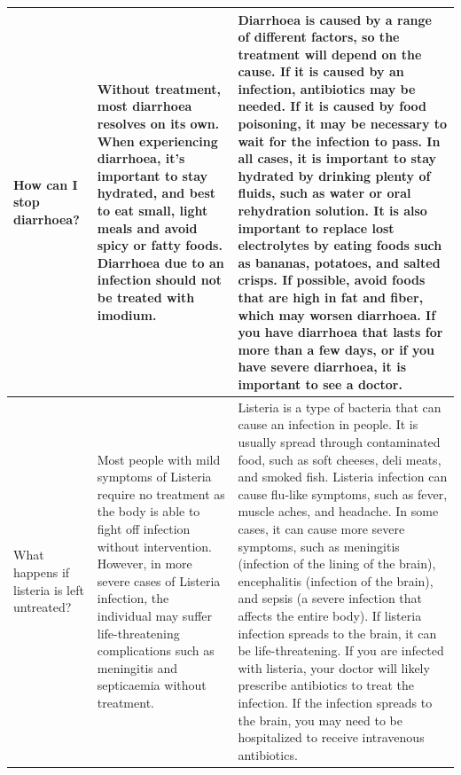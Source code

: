 \documentclass[10pt, letter, onecolumn]{arxiv}
\begin{document}
\begin{refsection}
\begin{table}[]
\begin{tabular}{p{}p{}p{}}
How can I stop diarrhoea? &
  Without treatment, most diarrhoea resolves on its own. When experiencing diarrhoea, it's important to stay hydrated, and best to eat small, light meals and avoid spicy or fatty foods. Diarrhoea due to an infection should not be treated with imodium. &
    Diarrhoea is caused by a range of different factors, so the treatment will depend on the cause. If it is caused by an infection, antibiotics may be needed. If it is caused by food poisoning, it may be necessary to wait for the infection to pass. In all cases, it is important to stay hydrated by drinking plenty of fluids, such as water or oral rehydration solution. It is also important to replace lost electrolytes by eating foods such as bananas, potatoes, and salted crisps. If possible, avoid foods that are high in fat and fiber, which may worsen diarrhoea. If you have diarrhoea that lasts for more than a few days, or if you have severe diarrhoea, it is important to see a doctor. 
  \\ \midrule

What happens if listeria is left untreated? &
    Most people with mild symptoms of Listeria require no treatment as the body is able to fight off infection without intervention. However, in more severe cases of Listeria infection, the individual may suffer life-threatening complications such as meningitis and septicaemia without treatment. &
    Listeria is a type of bacteria that can cause an infection in people. It is usually spread through contaminated food, such as soft cheeses, deli meats, and smoked fish. Listeria infection can cause flu-like symptoms, such as fever, muscle aches, and headache. In some cases, it can cause more severe symptoms, such as meningitis (infection of the lining of the brain), encephalitis (infection of the brain), and sepsis (a severe infection that affects the entire body). If listeria infection spreads to the brain, it can be life-threatening. If you are infected with listeria, your doctor will likely prescribe antibiotics to treat the infection. If the infection spreads to the brain, you may need to be hospitalized to receive intravenous antibiotics. 
    \\ \midrule
    

\end{tabular}
\end{table}
\end{refsection}
\end{document}
